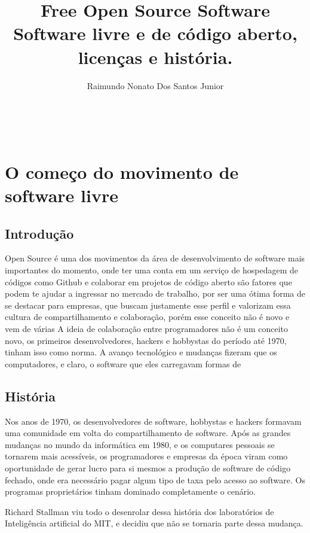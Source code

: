 \documentclass[12pt, a4paper]{report}
\title{Free Open Source Software\\\LARGE\vspace{0.5em} Software livre e de código aberto, licenças e história.}
\author{Raimundo Nonato Dos Santos Junior}
\renewcommand{\maketitle}{
  \begin{center}

  \vspace*{\fill}
  {\huge\bfseries\thetitle}\\
  \vspace{1.2em}
  {\large\bfseries\theauthor}
  \vspace*{\fill}
  \end{center}

  \newpage
}
\begin{document}

\maketitle

\tableofcontents

\chapter{O começo do movimento de software livre}

\section{Introdução}


Open Source é uma dos movimentos da área de desenvolvimento de software mais importantes do momento, onde ter uma conta em um serviço de hospedagem de códigos como Github e colaborar em projetos de código aberto são fatores que podem te ajudar a ingressar no mercado de trabalho, por ser uma ótima forma de se destacar para empresas, que buscam justamente esse perfil e valorizam essa cultura de compartilhamento e colaboração, porém esse conceito não é novo e vem de várias
A ideia de colaboração entre programadores não é um conceito novo, os primeiros desenvolvedores, hackers e hobbystas do período até 1970, tinham isso como norma.
A avanço tecnológico e mudanças fizeram que os computadores, e claro, o software que eles carregavam formas de 

\section{História}

Nos anos de 1970, os desenvolvedores de software, hobbystas e hackers formavam uma comunidade em volta do compartilhamento de software. Após as grandes mudanças no mundo da informática em 1980, e os computares pessoais se tornarem mais acessíveis, os programadores e empresas da época viram como oportunidade de gerar lucro para si mesmos a produção de software de código fechado, onde era necessário pagar algum tipo de taxa pelo acesso ao software. Os programas proprietários tinham dominado completamente o cenário.

Richard Stallman viu todo o desenrolar dessa história dos laboratórios de Inteligência artificial do MIT, e decidiu que não se tornaria parte dessa mudança. 
\end{document}
